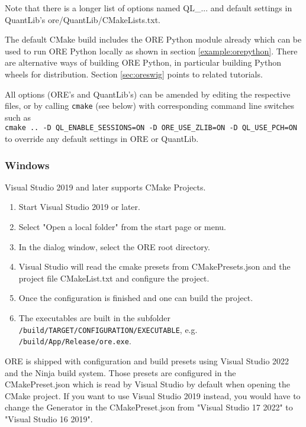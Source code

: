 Note that there is a longer list of options named QL\_... and default settings in QuantLib's ore/QuantLib/CMakeLists.txt.

The default CMake build includes the ORE Python module already which can be used to run ORE Python locally as shown in
section \ref{example:orepython}.
There are alternative ways of building ORE Python, in particular building Python wheels for distribution.
Section \ref{sec:oreswig} points to related tutorials.


All options (ORE's and QuantLib's) can be amended by editing the respective files, or 
by calling {\tt cmake} (see below) with corresponding command line switches such as \\
\medskip
    {\tt cmake ..  -D QL\_ENABLE\_SESSIONS=ON  -D ORE\_USE\_ZLIB=ON  -D QL\_USE\_PCH=ON} \\
\medskip
to override any default settings in ORE or QuantLib.

\subsubsection*{Windows}

Visual Studio 2019 and later supports CMake Projects.

\begin{enumerate}
\item Start Visual Studio 2019 or later.
\item Select "Open a local folder" from the start page or menu.
\item In the dialog window, select the ORE root directory.
\item Visual Studio will read the cmake presets from CMakePresets.json and the project file CMakeList.txt and configure the project.
\item Once the configuration is finished and one can build the project.
\item The executables are built in the subfolder {\tt /build/TARGET/CONFIGURATION/EXECUTABLE}, e.g. {\tt /build/App/Release/ore.exe}.
\end{enumerate}

ORE is shipped with configuration and build presets using Visual Studio 2022 and the Ninja build system. Those presets are configured in the CMakePreset.json which is read by Visual Studio by default when opening the CMake project. If you want to use Visual Studio 2019 instead, you would have to change the Generator in the CMakePreset.json from "Visual Studio 17 2022" to "Visual Studio 16 2019".

